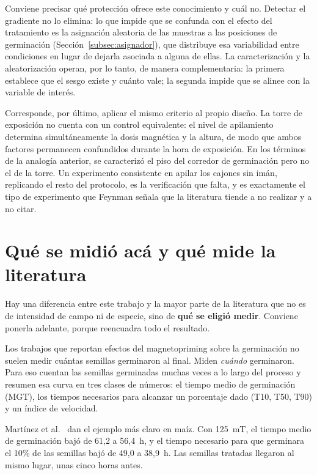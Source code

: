 Conviene precisar qué protección ofrece este conocimiento y cuál no. Detectar el gradiente no lo elimina: lo que impide que se confunda con el efecto del tratamiento es la asignación aleatoria de las muestras a las posiciones de germinación (Sección~\ref{subsec:asignador}), que distribuye esa variabilidad entre condiciones en lugar de dejarla asociada a alguna de ellas. La caracterización y la aleatorización operan, por lo tanto, de manera complementaria: la primera establece que el sesgo existe y cuánto vale; la segunda impide que se alinee con la variable de interés.

Corresponde, por último, aplicar el mismo criterio al propio diseño. La torre de exposición no cuenta con un control equivalente: el nivel de apilamiento determina simultáneamente la dosis magnética y la altura, de modo que ambos factores permanecen confundidos durante la hora de exposición. En los términos de la analogía anterior, se caracterizó el piso del corredor de germinación pero no el de la torre. Un experimento consistente en apilar los cajones sin imán, replicando el resto del protocolo, es la verificación que falta, y es exactamente el tipo de experimento que Feynman señala que la literatura tiende a no realizar y a no citar.

\section{Qué se midió acá y qué mide la literatura}
\label{sec:disc_punto_final}

Hay una diferencia entre este trabajo y la mayor parte de la literatura que no es de intensidad de campo ni de especie, sino de \textbf{qué se eligió medir}. Conviene ponerla adelante, porque reencuadra todo el resultado.

Los trabajos que reportan efectos del magnetopriming sobre la germinación no suelen medir cuántas semillas germinaron al final. Miden \emph{cuándo} germinaron. Para eso cuentan las semillas germinadas muchas veces a lo largo del proceso y resumen esa curva en tres clases de números: el tiempo medio de germinación (MGT), los tiempos necesarios para alcanzar un porcentaje dado (T10, T50, T90) y un índice de velocidad.

Martínez et al.~\cite{martinez_2017} dan el ejemplo más claro en maíz. Con 125~mT, el tiempo medio de germinación bajó de 61{,}2 a 56{,}4~h, y el tiempo necesario para que germinara el 10\% de las semillas bajó de 49{,}0 a 38{,}9~h. Las semillas tratadas llegaron al mismo lugar, unas cinco horas antes.

